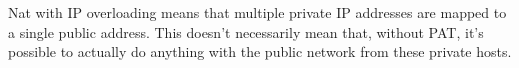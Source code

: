 Nat with IP overloading means that multiple private IP addresses are mapped to a single public address. This doesn't necessarily mean that, without PAT, it's possible to actually do anything with the public network from these private hosts.